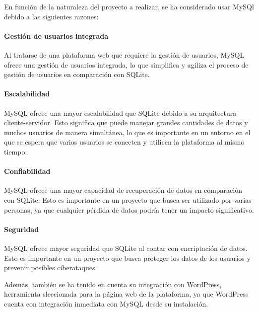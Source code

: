                 En función de la naturaleza del proyecto a realizar, se ha considerado usar MySQl debido a las siguientes razones:
                    
                \paragraph{Gestión de usuarios integrada}
                    
                    Al tratarse de una plataforma web que requiere la gestión de usuarios, MySQL ofrece una gestión de usuarios integrada, lo que simplifica y agiliza el proceso de gestión de usuarios en comparación con SQLite.
                
                \paragraph{Escalabilidad}
                    
                    MySQL ofrece una mayor escalabilidad que SQLite debido a su arquitectura cliente-servidor. Esto significa que puede manejar grandes cantidades de datos y muchos usuarios de manera simultánea, lo que es importante en un entorno en el que se espera que varios usuarios se conecten y utilicen la plataforma al mismo tiempo.

                \paragraph{Confiabilidad}
                    
                    MySQL ofrece una mayor capacidad de recuperación de datos en comparación con SQLite. Esto es importante en un proyecto que busca ser utilizado por varias personas, ya que cualquier pérdida de datos podría tener un impacto significativo.

                \paragraph{Seguridad}
                    
                    MySQL ofrece mayor seguridad que SQLite al contar con encriptación de datos. Esto es importante en un proyecto que busca proteger los datos de los usuarios y prevenir posibles ciberataques.

                Además, también se ha tenido en cuenta su integración con WordPress, herramienta sleccionada para la página web de la plataforma, ya que WordPress cuenta con integración inmediata con MySQL desde su instalación.    


